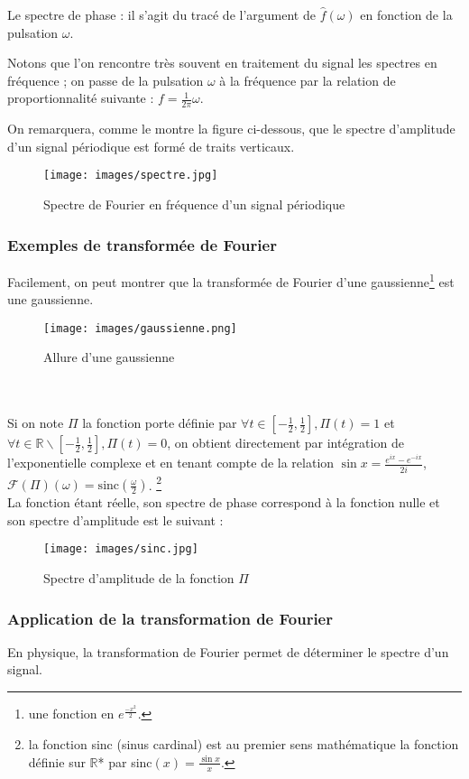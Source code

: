 Le spectre de phase :  il s'agit du tracé de l'argument de $\hat{f}(\omega)$ en fonction de la pulsation $\omega$.

Notons que l'on rencontre très souvent en traitement du signal les spectres en fréquence ; on passe de la pulsation $\omega$ à la fréquence par la relation de proportionnalité suivante : $f=\displaystyle \frac{1}{2\pi}\omega $.

On remarquera, comme le montre la figure ci-dessous, que le spectre d'amplitude d'un signal périodique est formé de traits verticaux.
\begin{figure}[!h]
\centering
\texttt{[image: images/spectre.jpg]}
\caption{Spectre de Fourier en fréquence d'un signal périodique}
\end{figure}

\subsubsection{Exemples de transformée de Fourier}

Facilement, on peut montrer que la transformée de Fourier d'une gaussienne\footnote{une fonction en $e^{\frac{-x^2}{2}}$.} est une gaussienne.
\begin{figure}[!h]
\centering
\texttt{[image: images/gaussienne.png]}
\caption{Allure d'une gaussienne}
\end{figure} \\ \\

Si on note $\Pi$ la fonction porte définie par 
$\forall t\in \left[-\frac{1}{2},\frac{1}{2} \right],\Pi(t)=1$ et $\forall t\in \mathbb{R} \backslash \left[-\frac{1}{2},\frac{1}{2} \right],\Pi(t)=0$, on obtient directement par intégration de l'exponentielle complexe et en tenant compte de la relation $\sin x = \displaystyle\frac{e^{ix}-e^{-ix}}{2i}$,
$\mathcal{F}(\Pi)(\omega) = \mathrm{sinc}(\frac{\omega}{2})$.  \footnote{la fonction sinc (sinus cardinal) est au premier sens mathématique la fonction définie sur $\mathbb{R}$* par sinc$(x)=\frac{\sin x}{x}$.} \\ La fonction étant réelle, son spectre de phase correspond à la fonction nulle et son spectre d'amplitude est le suivant : 
\begin{figure}[!h]
\centering
\texttt{[image: images/sinc.jpg]}
\caption{Spectre d'amplitude de la fonction $\Pi$}
\end{figure}


\subsubsection{Application de la transformation de Fourier}
En physique, la transformation de Fourier permet de déterminer le spectre d'un signal. 

